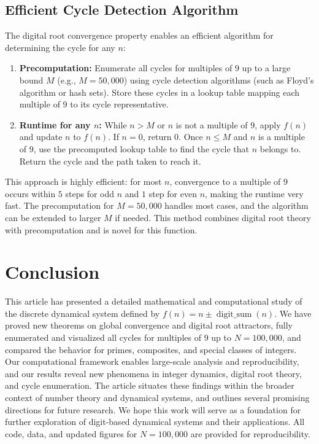 \documentclass[12pt]{article}
\begin{document}
\subsection{Efficient Cycle Detection Algorithm}
The digital root convergence property enables an efficient algorithm for determining the cycle for any $n$:
\begin{enumerate}
    \item \textbf{Precomputation:} Enumerate all cycles for multiples of $9$ up to a large bound $M$ (e.g., $M = 50,000$) using cycle detection algorithms (such as Floyd's algorithm or hash sets). Store these cycles in a lookup table mapping each multiple of $9$ to its cycle representative.
    \item \textbf{Runtime for any $n$:} While $n > M$ or $n$ is not a multiple of $9$, apply $f(n)$ and update $n$ to $f(n)$. If $n = 0$, return $0$. Once $n \leq M$ and $n$ is a multiple of $9$, use the precomputed lookup table to find the cycle that $n$ belongs to. Return the cycle and the path taken to reach it.
\end{enumerate}
This approach is highly efficient: for most $n$, convergence to a multiple of $9$ occurs within $5$ steps for odd $n$ and $1$ step for even $n$, making the runtime very fast. The precomputation for $M = 50,000$ handles most cases, and the algorithm can be extended to larger $M$ if needed. This method combines digital root theory with precomputation and is novel for this function.


\section{Conclusion}
This article has presented a detailed mathematical and computational study of the discrete dynamical system defined by $f(n) = n \pm \operatorname{digit\_sum}(n)$. We have proved new theorems on global convergence and digital root attractors, fully enumerated and visualized all cycles for multiples of $9$ up to $N=100,000$, and compared the behavior for primes, composites, and special classes of integers. Our computational framework enables large-scale analysis and reproducibility, and our results reveal new phenomena in integer dynamics, digital root theory, and cycle enumeration. The article situates these findings within the broader context of number theory and dynamical systems, and outlines several promising directions for future research. We hope this work will serve as a foundation for further exploration of digit-based dynamical systems and their applications. All code, data, and updated figures for $N=100,000$ are provided for reproducibility.
\end{document}

